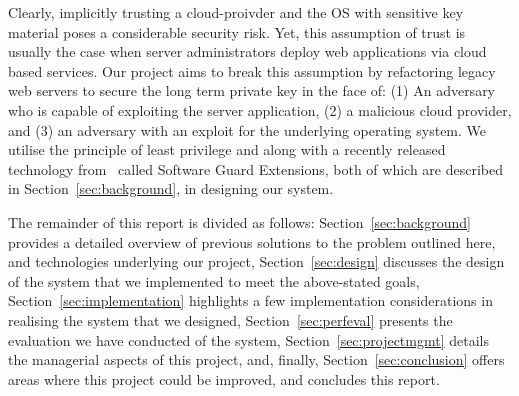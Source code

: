 \documentclass[../main.tex]{subfiles}
\begin{document}
Clearly, implicitly trusting a cloud-proivder and the OS with
sensitive key material poses a considerable security risk. Yet, this
assumption of trust is usually the case when server administrators
deploy web applications via cloud based services. Our project aims to
break this assumption by refactoring legacy web servers to secure the
long term private key in the face of: (1) An adversary who is capable
of exploiting the server application, (2) a malicious cloud provider,
and (3) an adversary with an exploit for the underlying operating
system. We utilise the principle of least privilege and along with a
recently released technology from \Intel~called Software Guard
Extensions, both of which are described in
Section~\ref{sec:background}, in designing our system.


The remainder of this report is divided as follows:
Section~\ref{sec:background} provides a detailed overview of previous
solutions to the problem outlined here, and technologies underlying
our project, Section~\ref{sec:design} discusses the design of the
system that we implemented to meet the above-stated goals,
Section~\ref{sec:implementation} highlights a few implementation
considerations in realising the system that we designed,
Section~\ref{sec:perfeval} presents the evaluation we have conducted
of the system, Section~\ref{sec:projectmgmt} details the managerial
aspects of this project, and, finally, Section~\ref{sec:conclusion}
offers areas where this project could be improved, and concludes this
report.
	
\end{document}
